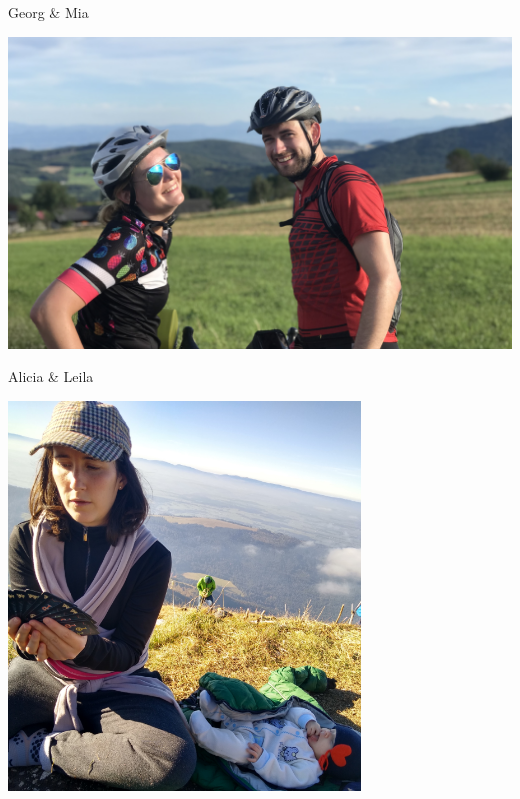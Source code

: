 \documentclass[10pt]{beamer}
\newenvironment{slide}[2][]
  {\begin{frame}[fragile,environment=slide,#1]{#2}}
  {\end{frame}}
\begin{document}
\begin{slide}{Georg \& Mia}
\begin{center}
\includegraphics[width=\textwidth]{figures/bike-trip.jpg}
\end{center}
\end{slide}

\begin{slide}{Alicia \& Leila}
\begin{center}
\includegraphics[width=0.7\textwidth]{figures/alicia-2.png}
\end{center}
\end{slide}
\end{document}
